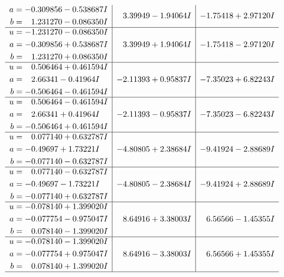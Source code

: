 \documentclass[1p]{elsarticle_modified}
\theoremstyle{definition}
\begin{document}
$$\begin{array}{c|c|c}
\begin{aligned}
a &= -0.309856 - 0.538687 I \\
b &= \phantom{-}1.231270 - 0.086350 I\end{aligned}
 & \phantom{-}3.39949 - 1.94064 I & -1.75418 + 2.97120 I \\ \hline\begin{aligned}
u &= -1.231270 - 0.086350 I \\
a &= -0.309856 + 0.538687 I \\
b &= \phantom{-}1.231270 + 0.086350 I\end{aligned}
 & \phantom{-}3.39949 + 1.94064 I & -1.75418 - 2.97120 I \\ \hline\begin{aligned}
u &= \phantom{-}0.506464 + 0.461594 I \\
a &= \phantom{-}2.66341 - 0.41964 I \\
b &= -0.506464 - 0.461594 I\end{aligned}
 & -2.11393 + 0.95837 I & -7.35023 + 6.82243 I \\ \hline\begin{aligned}
u &= \phantom{-}0.506464 - 0.461594 I \\
a &= \phantom{-}2.66341 + 0.41964 I \\
b &= -0.506464 + 0.461594 I\end{aligned}
 & -2.11393 - 0.95837 I & -7.35023 - 6.82243 I \\ \hline\begin{aligned}
u &= \phantom{-}0.077140 + 0.632787 I \\
a &= -0.49697 + 1.73221 I \\
b &= -0.077140 - 0.632787 I\end{aligned}
 & -4.80805 + 2.38684 I & -9.41924 - 2.88689 I \\ \hline\begin{aligned}
u &= \phantom{-}0.077140 - 0.632787 I \\
a &= -0.49697 - 1.73221 I \\
b &= -0.077140 + 0.632787 I\end{aligned}
 & -4.80805 - 2.38684 I & -9.41924 + 2.88689 I \\ \hline\begin{aligned}
u &= -0.078140 + 1.399020 I \\
a &= -0.077754 - 0.975047 I \\
b &= \phantom{-}0.078140 - 1.399020 I\end{aligned}
 & \phantom{-}8.64916 + 3.38003 I & \phantom{-}6.56566 - 1.45355 I \\ \hline\begin{aligned}
u &= -0.078140 - 1.399020 I \\
a &= -0.077754 + 0.975047 I \\
b &= \phantom{-}0.078140 + 1.399020 I\end{aligned}
 & \phantom{-}8.64916 - 3.38003 I & \phantom{-}6.56566 + 1.45355 I\\
 \hline 
 \end{array}$$\newpage
\end{document}
